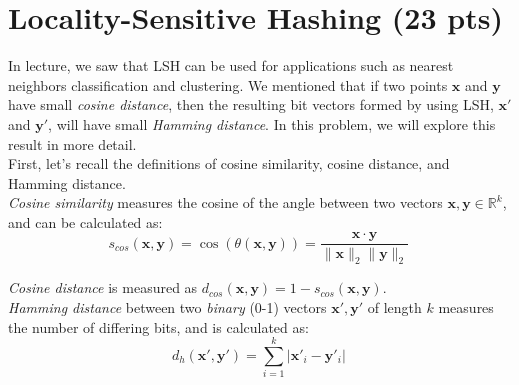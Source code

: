 \documentclass{exam}
\newcommand{\R}{\mathbb{R}} %
\newcommand{\xv}{\mathbf{x}}
\newcommand{\yv}{\mathbf{y}}
\begin{document}
\newpage
\section{Locality-Sensitive Hashing (23 pts)}

In lecture, we saw that LSH can be used for applications such as nearest neighbors classification and clustering. We mentioned that if two points $\xv$ and $\yv$ have small \textit{cosine distance}, then the resulting bit vectors formed by using LSH, $\xv'$ and $\yv'$, will have small \textit{Hamming distance}. In this problem, we will explore this result in more detail. \\

\noindent First, let's recall the definitions of cosine similarity, cosine distance, and Hamming distance.\\

\noindent \textit{Cosine similarity} measures the cosine of the angle between two vectors $\xv, \yv \in \R^k$, and can be calculated as:
$$ s_{cos}(\xv,\yv) = \cos(\theta(\xv,\yv)) =  \frac{\xv \cdot \yv}{\|\xv\|_2 \|\yv\|_2} \, $$

\noindent \textit{Cosine distance} is measured as $d_{cos}(\xv,\yv) = 1-s_{cos}(\xv,\yv).$ \\

\noindent \textit{Hamming distance} between two \textit{binary} (0-1) vectors $\xv', \yv'$ of length $k$ measures the number of differing bits, and is calculated as:
$$ d_{h} (\xv',\yv') = \sum_{i=1}^k |\xv'_i - \yv'_i| \, $$
\vspace{1em}
\end{document}
